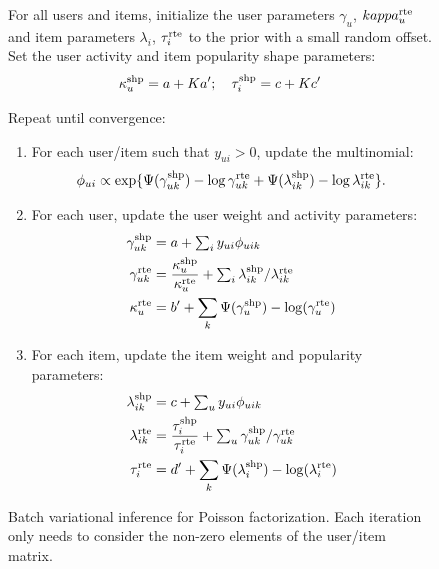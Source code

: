 \documentclass{sig-alternate}
\begin{document}
\begin{figure}
  \begin{framed}
    For all users and items, initialize the user parameters
    $\gamma_u$, $kappa_u^{\textrm{rte}}$ and item parameters $\lambda_i$,
    $\tau_i^{\textrm{rte}}$ to the prior with a small random offset. Set the
    user activity and item popularity shape parameters:
    \begin{align}
      \kappa_u^{\textrm{shp}} = a + Ka'; \quad \tau_i^{\textrm{shp}} = c + Kc'\nonumber
    \end{align}

    \vspace{0.1in}

    Repeat until convergence:
    \begin{enumerate}
    \item For each user/item such that $y_{ui} > 0$, update the multinomial:
      \begin{equation*}
        \phi_{ui} \propto \exp\{\Psi(\gamma_{uk}^{\textrm{shp}}) - \log
        \gamma_{uk}^{\textrm{rte}} + \Psi(\lambda_{ik}^{\textrm{shp}}) - \log
        \lambda_{ik}^{\textrm{rte}}\}.
      \end{equation*}
    \item For each user, update the user weight and activity parameters:
      \begin{align}
        \gamma_{uk}^{\textrm{shp}} & = a + \textstyle \sum_{i} y_{ui}
        \phi_{uik} \nonumber\\
        \gamma_{uk}^{\textrm{rte}} & = \frac{\kappa_u^{\textrm{shp}}}{\kappa_u^{\textrm{rte}}} + \textstyle \sum_i \lambda_{ik}^{\textrm{shp}} / \lambda_{ik}^{\textrm{rte}}\nonumber\\
        \kappa_{u}^{\textrm{rte}} & = b' + \sum_k \Psi(\gamma_u^{\textrm{shp}}) - \log(\gamma_u^{\textrm{rte}})\nonumber
      \end{align}
    \item For each item, update the item weight and popularity parameters:
      \begin{align}
        \lambda_{ik}^{\textrm{shp}} & = c + \textstyle \sum_{u} y_{ui}
        \phi_{uik}\nonumber\\
        \lambda_{ik}^{\textrm{rte}} & = \frac{\tau_i^{\textrm{shp}}}{\tau_i^{\textrm{rte}}} + \textstyle \sum_u
        \gamma_{uk}^{\textrm{shp}} / \gamma_{uk}^{\textrm{rte}}\nonumber\\
        \tau_{i}^{\textrm{rte}} & = d' + \sum_k \Psi(\lambda_i^{\textrm{shp}}) -
        \log(\lambda_i^{\textrm{rte}})\nonumber
      \end{align}
    \end{enumerate}
\end{framed}
\caption{\label{fig:batch}Batch variational inference for Poisson
  factorization.  Each iteration only needs to consider the non-zero
  elements of the user/item matrix.}
\end{figure}
\end{document}

